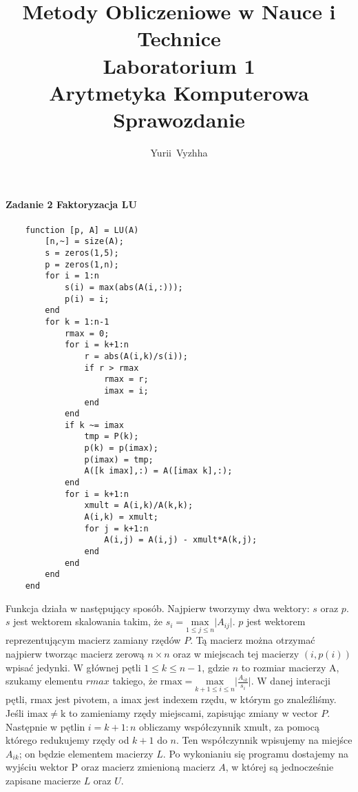 \documentclass[12pt,a4paper]{article}
\author{Yurii~Vyzhha}
\title{Metody Obliczeniowe w Nauce i Technice \\ Laboratorium 1 \\
  Arytmetyka Komputerowa \\ Sprawozdanie}
\begin{document}
  \maketitle
  \paragraph{Zadanie 2 Faktoryzacja LU}%
  \begin{Verbatim}
    function [p, A] = LU(A)
        [n,~] = size(A);
        s = zeros(1,5);
        p = zeros(1,n);
        for i = 1:n
            s(i) = max(abs(A(i,:)));
            p(i) = i;
        end
        for k = 1:n-1
            rmax = 0;
            for i = k+1:n
                r = abs(A(i,k)/s(i));
                if r > rmax
                    rmax = r;
                    imax = i;
                end
            end
            if k ~= imax
                tmp = P(k);
                p(k) = p(imax);
                p(imax) = tmp;
                A([k imax],:) = A([imax k],:);
            end
            for i = k+1:n
                xmult = A(i,k)/A(k,k);
                A(i,k) = xmult;
                for j = k+1:n
                    A(i,j) = A(i,j) - xmult*A(k,j);
                end
            end
        end
    end
  \end{Verbatim}
  Funkcja działa w następujący sposób. Najpierw tworzymy dwa wektory: $s$ oraz $p$.
  $s$ jest wektorem skalowania takim, że
  $s_i = \underset{1 \leq j \leq n}{\mathrm{max}}\lvert A_{ij} \rvert$.
  $p$ jest wektorem reprezentującym macierz zamiany rzędów $P$. Tą macierz można otrzymać
  najpierw tworząc macierz zerową $n \times n$ oraz w miejscach tej macierzy $(i,p(i))$
  wpisać jedynki. W głównej pętli $1 \leq k \leq n-1$, gdzie $n$ to rozmiar macierzy A,
  szukamy elementu $rmax$ takiego, że
  $\mathrm{rmax} = \underset{k+1 \leq i \leq n}{\mathrm{max}} \lvert \frac{A_{ik}}{s_i} \rvert$.
  W danej interacji pętli, rmax jest pivotem, a imax jest indexem rzędu, w
  którym go znaleźliśmy. Jeśli $\mathrm{imax} \neq \mathrm{k}$ to zamieniamy
  rzędy miejscami, zapisując zmiany w vector $P$. Następnie w pętlin $i = k+1:n$ obliczamy
  współczynnik xmult, za pomocą którego redukujemy rzędy od $k+1$ do $n$. Ten współczynnik
  wpisujemy na miejśce $A_{ik}$; on będzie elementem macierzy $L$. Po wykonianiu się
  programu dostajemy na wyjściu wektor P oraz macierz zmienioną macierz $A$, w
  której są jednocześnie zapisane macierze $L$ oraz $U$. \newline
\end{document}
